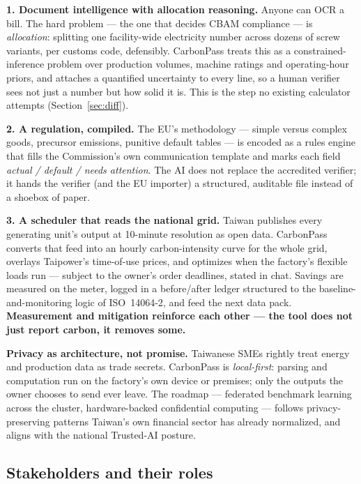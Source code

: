 \textbf{1. Document intelligence with allocation reasoning.} Anyone can OCR a
bill. The hard problem --- the one that decides CBAM compliance --- is
\emph{allocation}: splitting one facility-wide electricity number across
dozens of screw variants, per customs code, defensibly. CarbonPass treats this
as a constrained-inference problem over production volumes, machine ratings
and operating-hour priors, and attaches a quantified uncertainty to every
line, so a human verifier sees not just a number but how solid it is. This is
the step no existing calculator attempts (Section~\ref{sec:diff}).

\textbf{2. A regulation, compiled.} The EU's methodology --- simple versus
complex goods, precursor emissions, punitive default tables --- is encoded as
a rules engine that fills the Commission's own communication template and
marks each field \emph{actual / default / needs attention}. The AI does not
replace the accredited verifier; it hands the verifier (and the EU importer) a
structured, auditable file instead of a shoebox of paper.

\textbf{3. A scheduler that reads the national grid.} Taiwan publishes
every generating unit's output at 10-minute resolution as open
data\cite{taipowerdata}. CarbonPass converts that feed into an hourly
carbon-intensity curve for the whole grid, overlays Taipower's time-of-use
prices, and optimizes when the factory's flexible loads run --- subject to the
owner's order deadlines, stated in chat. Savings are measured on the meter,
logged in a before/after ledger structured to the baseline-and-monitoring
logic of ISO~14064-2, and feed the next data pack. \textbf{Measurement and
mitigation reinforce each other --- the tool does not just report carbon, it
removes some.}

\textbf{Privacy as architecture, not promise.} Taiwanese SMEs rightly treat
energy and production data as trade secrets. CarbonPass is \emph{local-first}:
parsing and computation run on the factory's own device or premises; only the
outputs the owner chooses to send ever leave. The roadmap --- federated
benchmark learning across the cluster, hardware-backed confidential computing
--- follows privacy-preserving patterns Taiwan's own financial sector has
already normalized, and aligns with the national Trusted-AI posture.

\subsection{Stakeholders and their roles}

